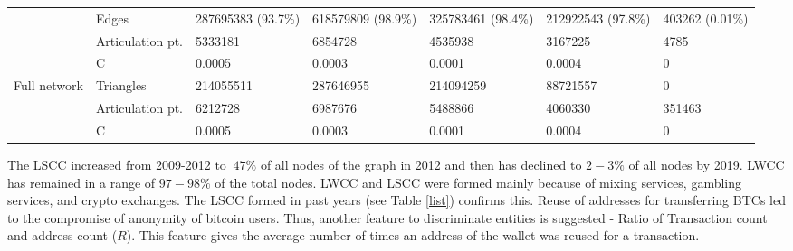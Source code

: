 \documentclass[preprint,12pt]{elsarticle}
\begin{document}
\begin{table}[H]
{\begin{tabular}{|l|l|l|l|l|l|l|}
                                  & Edges    & 287695383 (93.7\%)           &   618579809 (98.9\%)          &    325783461  (98.4\%)     &           212922543  (97.8\%)  & 403262 (0.01\%)      \\
                                  \cline{2-7} 
                           
                                 & Articulation pt.     &     5333181        &      6854728       &   4535938        &              3167225    & 4785    \\
                                \cline{2-7} 
                         
                              & C            & 0.0005            &      0.0003       &     0.0001      &     0.0004    & 0   \\ \hline
                              
\multirow{3}{*}{Full network} & Triangles    & 214055511            &    287646955         &     214094259      &    88721557 & 0     \\ \cline{2-7} 
                   
                           & Articulation pt.     &       6212728      &       6987676      &    5488866       &   4060330   & 351463 \\
                                  \cline{2-7} 
                         
                              & C            & 0.0005            &   0.0003          & 0.0001          &    0.0004 & 0   \\ \hline
\end{tabular}}
\end{table}


The LSCC increased from 2009-2012 to $~47\%$ of all nodes of the graph in 2012 and then has declined to $2-3\%$ of all nodes by 2019. LWCC has remained in a range of $97-98\%$ of the total nodes. LWCC and LSCC were formed mainly because of mixing services, gambling services, and crypto exchanges. The LSCC formed in past years (see Table \ref{list}) confirms this. Reuse of addresses for transferring BTCs led to the compromise of anonymity of bitcoin users. Thus, another feature to discriminate entities is suggested - Ratio of Transaction count and address count ($R$). This feature gives the average number of times an address of the wallet was reused for a transaction.
\end{document}
